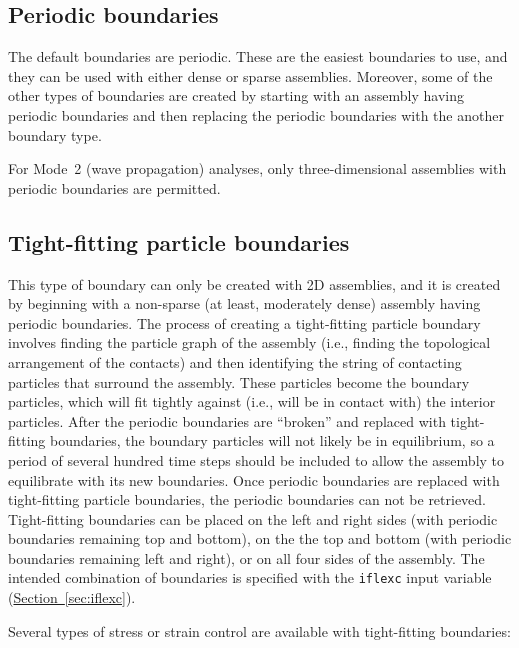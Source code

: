 \documentclass[letterpaper,11pt]{article}
\begin{document}
\subsection{Periodic boundaries}\label{sec:Periodic}
The default boundaries are periodic.
These are the easiest boundaries to use, 
and they can be used with either dense or sparse assemblies.
Moreover, some of the other types of boundaries are created by starting
with an assembly having periodic boundaries and then replacing the
periodic boundaries with the another boundary type.
%
\par
For Mode~2 (wave propagation) analyses,
only three-dimensional assemblies
with periodic boundaries are permitted.
%
\subsection{Tight-fitting particle boundaries}\label{sec:TightFitting}
This type of boundary can only be created with 2D assemblies,
and it is created by beginning with a non-sparse (at least, moderately
dense) assembly having periodic boundaries.
The process of creating a tight-fitting particle boundary involves
finding the particle graph of the assembly (i.e., finding the
topological arrangement of the contacts) and then identifying the string
of contacting particles that surround the assembly.
These particles become the boundary particles, which will fit tightly
against (i.e., will be in contact with) the interior particles.
After the periodic boundaries are ``broken'' and replaced with
tight-fitting boundaries, the boundary particles will not likely be
in equilibrium, so a period of several hundred time steps should be
included to allow the assembly to equilibrate with its new boundaries.
Once periodic boundaries are replaced with tight-fitting particle boundaries,
the periodic boundaries can not be retrieved.
Tight-fitting boundaries can be placed on the left and right sides (with
periodic boundaries remaining top and bottom), on the the top and bottom
(with periodic boundaries remaining left and right), or on all four sides
of the assembly.  The intended combination of boundaries is specified
with the \texttt{iflexc} input variable
(\hyperref[sec:iflexc]{Section~\ref*{sec:iflexc}}).
\par
Several types of stress or strain control are available with tight-fitting
boundaries:
\end{document}
